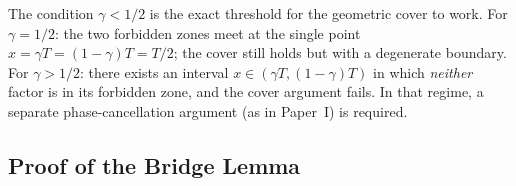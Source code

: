 \begin{remark}
\label{rem:bridge:halfsharp}
The condition $\gamma < 1/2$ is the exact threshold for the
geometric cover to work.
For $\gamma = 1/2$: the two forbidden zones meet at the single
point $x = \gamma T = (1-\gamma)T = T/2$; the cover still holds
but with a degenerate boundary.
For $\gamma > 1/2$: there exists an interval
$x \in (\gamma T, (1-\gamma)T)$ in which
\emph{neither} factor is in its forbidden zone, and the
cover argument fails.
In that regime, a separate phase-cancellation argument
(as in Paper~I) is required.
\end{remark}

\subsection{Proof of the Bridge Lemma}
\label{subsec:bridge-proof}

